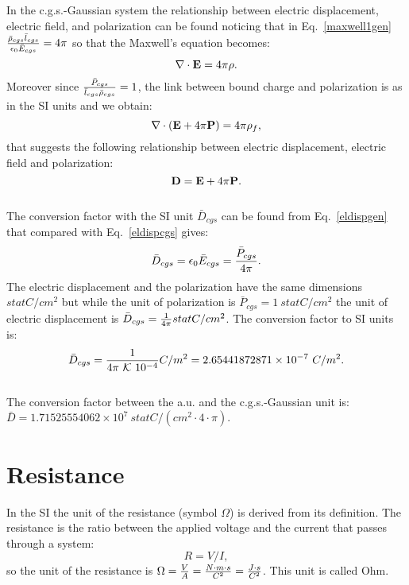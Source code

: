 \documentclass[12pt,a4paper]{article}
\def\dtod{2.65441872871\times 10^{-7}}
\def\bardcgs{1.71525554062\times 10^{7}}
\begin{document}
{\color{orange} In the c.g.s.-Gaussian system the relationship
between electric displacement, electric field, and polarization can 
be found noticing that in Eq.~\ref{maxwell1gen}
${\bar \rho_{cgs} \bar l_{cgs} \over \epsilon_0 \bar E_{cgs}}=4\pi$
so that the Maxwell's equation becomes:
\begin{equation}
\nabla \cdot {\bf E} = 4 \pi \rho.
\end{equation}
Moreover since ${\bar P_{cgs} \over \bar l_{cgs} \bar \rho_{cgs}}=1$,
the link between bound charge and polarization is as in the SI units and
we obtain:
\begin{equation}
\nabla \cdot ({\bf E}+ 4 \pi {\bf P})=4 \pi \rho_f, 
\end{equation}
that suggests the following relationship between electric displacement,
electric field and polarization:
\begin{equation}
{\bf D} =  {\bf E} + 4 \pi {\bf P}.
\label{eldispcgs}
\end{equation}
\\
The conversion factor with the SI unit $\bar D_{cgs}$ can be found
from Eq.~\ref{eldispgen} that compared with Eq.~\ref{eldispcgs} gives:
\begin{equation}
\bar D_{cgs}= {\epsilon_0 \bar E_{cgs}}= {\bar P_{cgs} \over 4 \pi}.
\end{equation}
The electric displacement and the polarization 
have the same dimensions $statC/cm^2$ but while the unit of polarization
is $\bar P_{cgs}=1\ statC/cm^2$ the unit of electric displacement 
is $\bar D_{cgs}={1\over 4 \pi} statC/cm^2$.
The conversion factor to SI units is:
\begin{equation}
\bar D_{cgs}= {1\over 4 \pi\ \mathcal{K}\ 10^{-4}} C/m^2=\dtod\ C/m^2. 
\end{equation}
}
\\

{\color{green} 
The conversion factor between the a.u. and the c.g.s.-Gaussian unit is: 
$\bar D = \bardcgs \ statC/(cm^2 \cdot 4 \cdot \pi)$.
}

\newpage
\section{\color{coral}Resistance}
In the SI the unit of the resistance (symbol $\Omega$)
is derived from its definition. The resistance is the ratio between 
the applied voltage and the current that passes through a system:
\begin{equation}
R=V/I,
\end{equation}
so the unit of the resistance is $\Omega={V \over A}=
{N\cdot m \cdot s \over C^2}={J\cdot s \over C^2}$. This
unit is called Ohm.
\\
\end{document}

